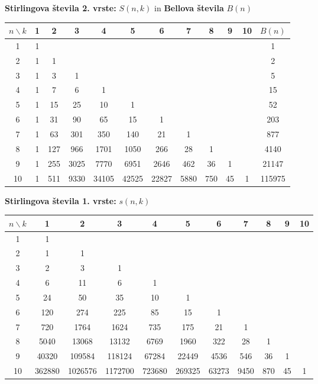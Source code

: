 \documentclass[a4paper,oneside,12pt]{article}
\newenvironment{description*}%
{
\begin{description}
\setlength{\itemsep}{0pt}
\setlength{\parskip}{2pt}
}
{\end{description}}
\begin{document}
\begin{description*}
{    \textbf{Stirlingova števila 2. vrste:} $S(n, k)$ in \textbf{Bellova števila} $B(n)$\\
    \begin{tabular}{|*{12}{c|}}
      \hline
      $n \backslash k$ & 1&2&3&4&5&6&7&8&9&10&$B(n)$ \\ \hline
      1 & 1 &  &  &  &  &  &  &  &  & & 1 \\ \hline
      2 & 1 & 1 &  &  &  &  &  &  &  & & 2 \\ \hline
      3 & 1 & 3 & 1 &  &  &  &  &  &  & & 5 \\ \hline
      4 & 1 & 7 & 6 & 1 &  &  &  &  &  & & 15 \\ \hline
      5 & 1 & 15 & 25 & 10 & 1 &  &  &  &  & & 52 \\ \hline
      6 & 1 & 31 & 90 & 65 & 15 & 1 &  &  &  & & 203\\ \hline
      7 & 1 & 63 & 301 & 350 & 140 & 21 & 1 &  &  & & 877 \\ \hline
      8 & 1 & 127 & 966 & 1701 & 1050 & 266 & 28 & 1 &  & & 4140 \\ \hline
      9 & 1 & 255 & 3025 & 7770 & 6951 & 2646 & 462 & 36 & 1 & & 21147 \\ \hline
      10 & 1 & 511 & 9330 & 34105 & 42525 & 22827 & 5880 & 750 & 45 & 1 & 115975 \\ \hline
    \end{tabular}

    \textbf{Stirlingova števila 1. vrste:} $s(n, k)$ \\
    \begin{tabular}{|*{11}{c|}}
      \hline
      $n \backslash k$ & 1&2&3&4&5&6&7&8&9&10 \\ \hline
      1 & 1 &  &  &  &  &  &  &  &  & \\ \hline
      2 & 1 & 1 &  &  &  &  &  &  &  & \\ \hline
      3 & 2 & 3 & 1 &  &  &  &  &  &  & \\ \hline
      4 & 6 & 11 & 6 & 1 &  &  &  &  &  & \\ \hline
      5 & 24 & 50 & 35 & 10 & 1 &  &  &  &  & \\ \hline
      6 & 120 & 274 & 225 & 85 & 15 & 1 &  &  &  & \\ \hline
      7 & 720 & 1764 & 1624 & 735 & 175 & 21 & 1 &  &  & \\ \hline
      8 & 5040 & 13068 & 13132 & 6769 & 1960 & 322 & 28 & 1 &  & \\ \hline
      9 & 40320 & 109584 & 118124 & 67284 & 22449 & 4536 & 546 & 36 & 1 & \\ \hline
      10 & 362880 & 1026576 & 1172700 & 723680 & 269325 & 63273 & 9450 & 870 & 45 & 1\\ \hline
    \end{tabular}

}
\end{description*}
\end{document}
